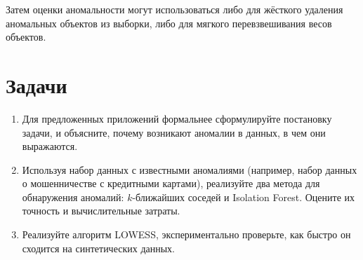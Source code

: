 Затем оценки аномальности могут использоваться либо для жёсткого удаления аномальных объектов из выборки, либо для мягкого перевзвешивания весов объектов.

\section{Задачи}
\begin{enumerate}
    \item Для предложенных приложений формальнее сформулируйте постановку задачи, и объясните, почему возникают аномалии в данных, в чем они выражаются.
    \item Используя набор данных с известными аномалиями (например, набор данных о мошенничестве с кредитными картами), реализуйте два метода для обнаружения аномалий: $k$-ближайших соседей и Isolation Forest. Оцените их точность и вычислительные затраты.
    \item Реализуйте алгоритм LOWESS, экспериментально проверьте, как быстро он сходится на синтетических данных. 
\end{enumerate}
